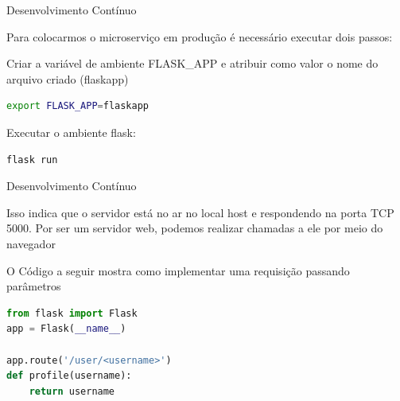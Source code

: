\documentclass[aspectratio=169]{beamer} %
\begin{document}
\begin{SliTC}{Desenvolvimento Contínuo}

Para colocarmos o microserviço em produção é necessário executar dois passos:

Criar a variável de ambiente FLASK\_APP e atribuir como valor o nome do arquivo criado (flaskapp)

\begin{lstlisting}[language=bash]
export FLASK_APP=flaskapp
\end{lstlisting}

Executar o ambiente flask:

\begin{lstlisting}[language=bash]
flask run
\end{lstlisting}

\end{SliTC}


\begin{SliTC}{Desenvolvimento Contínuo}
 
 Isso indica que o servidor está no ar no local host e respondendo na porta TCP 5000. Por ser um servidor web, podemos realizar chamadas a ele por meio do navegador

O Código a seguir mostra como implementar uma requisição passando parâmetros

\begin{lstlisting}[language=Python]
from flask import Flask
app = Flask(__name__)

app.route('/user/<username>')
def profile(username):
    return username
\end{lstlisting}
\end{SliTC}


 {

\begin{itemize}





\end{itemize}

}
\end{document}
